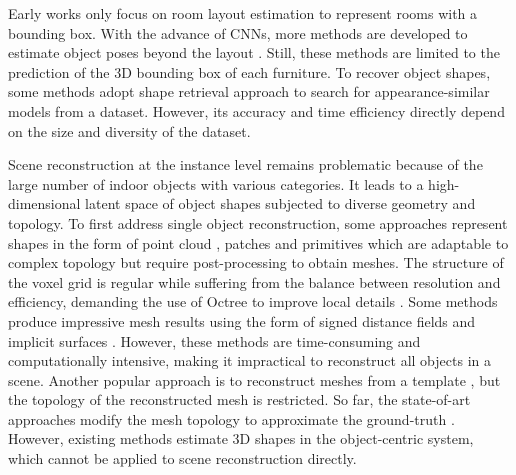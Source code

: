 \documentclass[10pt,twocolumn,letterpaper]{article}
\begin{document}
Early works only focus on room layout estimation \cite{hedau2009recovering, lee2009geometric, mallya2015learning, dasgupta2016delay, ren2016coarse} to represent rooms with a bounding box. With the advance of CNNs, more methods are developed to estimate object poses beyond the layout \cite{du2018learning, huang2018cooperative, chen2019holistic++}. Still, these methods are limited to the prediction of the 3D bounding box of each furniture. To recover object shapes, some methods \cite{izadinia2017im2cad,hueting2017seethrough,huang2018holistic} adopt shape retrieval approach to search for appearance-similar models from a dataset. However, its accuracy and time efficiency directly depend on the size and diversity of the dataset.

Scene reconstruction at the instance level remains problematic because of the large number of indoor objects with various categories. It leads to a high-dimensional latent space of object shapes subjected to diverse geometry and topology.
To first address single object reconstruction, some approaches represent shapes in the form of point cloud \cite{fan2017point,mandikal20183d,kurenkov2018deformnet,navaneet2019capnet}, patches \cite{groueix2018,wang2018adaptive} and primitives \cite{tian2019learning,tulsiani2017learning,paschalidou2019superquadrics,deprelle2019learning} which are adaptable to complex topology but require post-processing to obtain meshes. The structure of the voxel grid \cite{3D-R2N2,LiaoDG18,Wallace} is regular while suffering from the balance between resolution and efficiency, demanding the use of Octree to improve local details \cite{riegler2017octnet,tatarchenko2017octree,wang2018adaptive}. Some methods produce impressive mesh results using the form of signed distance fields \cite{park2019deepsdf} and implicit surfaces \cite{chen2019learning,michalkiewicz2019deep,xu2019disn,mescheder2019occupancy}. However, these methods are time-consuming and computationally intensive, making it impractical to reconstruct all objects in a scene. Another popular approach is to reconstruct meshes from a template \cite{wang2018pixel2mesh,groueix2018,kato2018neural}, but the topology of the reconstructed mesh is restricted. So far, the state-of-art approaches modify the mesh topology to approximate the ground-truth \cite{Junyi,tang2019skeleton}. However, existing methods estimate 3D shapes in the object-centric system, which cannot be applied to scene reconstruction directly.
\end{document}
